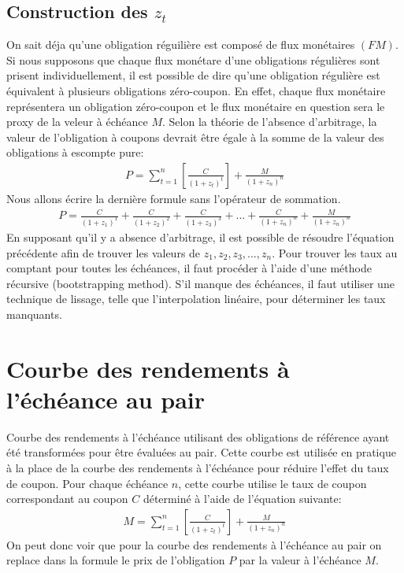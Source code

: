 \documentclass[12pt]{article}
\begin{document}
\subsection{Construction des $z_t$}
On sait déja qu'une obligation réguilière est composé de flux monétaires $(FM)$.  Si nous supposons que chaque flux monétare d'une obligations régulières sont prisent individuellement,  il est possible de dire qu'une obligation régulière est équivalent à plusieurs obligations zéro-coupon. En effet,  chaque flux monétaire représentera un obligation zéro-coupon et le flux monétaire en question sera le proxy de la veleur à échéance $M$.  Selon la théorie de l’absence d’arbitrage, la valeur de l’obligation à coupons devrait être égale à la somme de la valeur des obligations à escompte pure:
\begin{align*}
P=\sum_{t=1}^n \left[ \frac{C}{(1+z_t)^t} \right]+\frac{M}{(1+z_n)^{n}}
\end{align*}
Nous allons écrire la dernière formule sans l'opérateur de sommation.
\begin{align*}
P=\frac{C}{(1+z_1)^1}+\frac{C}{(1+z_2)^2}+\frac{C}{(1+z_3)^3}+...+\frac{C}{(1+z_n)^n}+\frac{M}{(1+z_n)^{n}}
\end{align*}
En supposant qu’il y a absence d’arbitrage,  il est possible de résoudre l’équation précédente afin de trouver les valeurs de $z_1, z_2, z_3,...,z_n$.  Pour trouver les taux au comptant pour toutes les échéances,  il faut procéder à l’aide d’une méthode récursive (bootstrapping method).  S’il manque des échéances, il faut utiliser une technique de lissage, telle que l’interpolation linéaire, pour déterminer les taux manquants.
\section{Courbe des rendements à l’échéance au pair}
Courbe des rendements à l’échéance utilisant des obligations de référence ayant été transformées pour être évaluées au pair.  Cette courbe est utilisée en pratique à la place de la courbe des rendements à l’échéance pour réduire l’effet du taux de coupon.  Pour chaque échéance $n$,  cette courbe utilise le taux de coupon correspondant au coupon $C$ déterminé à l’aide de l’équation suivante:
\begin{align*}
M=\sum_{t=1}^n \left[ \frac{C}{(1+z_t)^t} \right]+\frac{M}{(1+z_n)^{n}}
\end{align*} 
On peut donc voir que pour la courbe des rendements à l’échéance au pair on replace dans la formule le prix de l'obligation $P$ par la valeur à l'échéance $M$.
\end{document}
